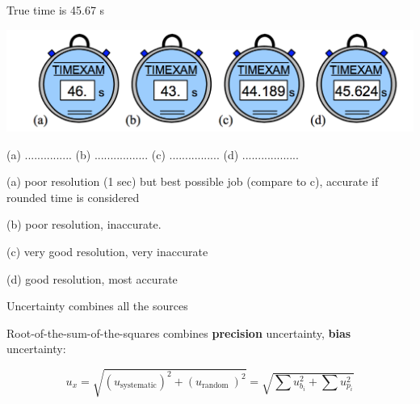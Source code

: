 \documentclass[12pt]{beamer}
\begin{document}
\begin{frame}{True time is 45.67 s}

\includegraphics[width=1\textwidth]{stopwatchexample}

\bigskip

(a) ............... (b) ................. (c) ................ (d) ..................

\end{frame}

\begin{frame}
(a) poor resolution (1 sec) but best possible job (compare to c), accurate
if rounded time is considered

(b) poor resolution, inaccurate.

(c) very good resolution, very inaccurate

(d) good resolution, most accurate
\end{frame}



\begin{frame}{Uncertainty combines all the sources }

Root-of-the-sum-of-the-squares combines \textbf{precision}
uncertainty, \textbf{bias} uncertainty: 

\[
u_{x}=\sqrt{\left(u_{\textrm{systematic}}\right)^{2}+\left(u_{\textrm{random }}\right)^{2}}=\sqrt{\sum u_{b_i}^{2}+\sum u_{p_i}^{2}}
\]

\end{frame}


%
%
%
%
\end{document}
